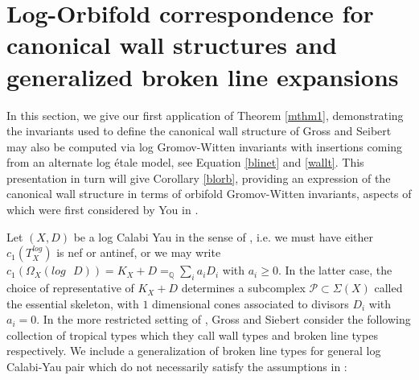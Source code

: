 \documentclass[12pt, oneside]{amsart}   	%
\newcounter{thm}
\newcommand{\NN}{\mathbb{N}}
\numberwithin{equation}{section}
\numberwithin{thm}{section}
\numberwithin{figure}{section}
\begin{document}
%
%
%
%
%
%


\section{Log-Orbifold correspondence for canonical wall structures and generalized broken line expansions}

In this section, we give our first application of Theorem \ref{mthm1}, demonstrating the invariants used to define the canonical wall structure of Gross and Seibert may also be computed via log Gromov-Witten invariants with insertions coming from an alternate log \'etale model, see Equation \ref{blinet} and \ref{wallt}. This presentation in turn will give Corollary \ref{blorb}, providing an expression of the canonical wall structure in terms of orbifold Gromov-Witten invariants, aspects of which were first considered by You in \cite{orbBL}.

Let $(X,D)$ be a log Calabi Yau in the sense of \cite{int_mirror}, i.e. we must have either $c_1(T^{log}_X)$ is nef or antinef, or we may write $c_1(\Omega_X(log\text{ }D)) = K_X  + D =_\mathbb{Q} \sum_i a_iD_i$ with $a_i\ge 0$. In the latter case, the choice of representative of $K_X + D$ determines a subcomplex $\mathscr{P} \subset \Sigma(X)$ called the essential skeleton, with $1$ dimensional cones associated to divisors $D_i$ with $a_i = 0$. In the more restricted setting of \cite{scatt}, Gross and Siebert consider the following collection of tropical types which they call wall types and broken line types respectively. We include a generalization of broken line types for general log Calabi-Yau pair which do not necessarily satisfy the assumptions in \cite{scatt}:
\end{document}
